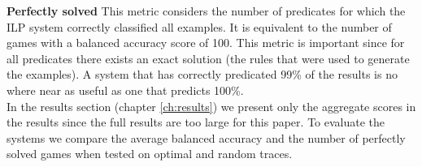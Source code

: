 \textbf{Perfectly solved} This metric considers the number of predicates for which the ILP system correctly classified all examples. It is equivalent to the number of games with a balanced accuracy score of 100. This metric is important since for all predicates there exists an exact solution (the rules that were used to generate the examples). A system that has correctly predicated 99\% of the results is no where near as useful as one that predicts 100\%.
\\

In the results section (chapter \ref{ch:results}) we present only the aggregate scores in the results since the full results are too large for this paper. To evaluate the systems we compare the average balanced accuracy and the number of perfectly solved games when tested on optimal and random traces.



